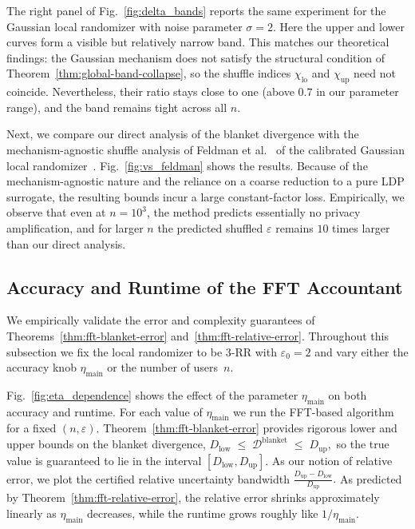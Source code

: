 \documentclass{article}
\theoremstyle{plain}
\theoremstyle{definition}
\begin{document}
The right panel of Fig.~\ref{fig:delta_bands} reports the same experiment for the Gaussian local randomizer with noise parameter $\sigma=2$.
Here the upper and lower curves form a visible but relatively narrow band.
This matches our theoretical findings: the Gaussian mechanism does not satisfy the structural condition of
Theorem~\ref{thm:global-band-collapse}, so the shuffle indices $\chi_{\mathrm{lo}}$ and $\chi_{\mathrm{up}}$ need not coincide.
Nevertheless, their ratio stays close to one (above $0.7$ in our parameter range), and the band remains tight across all $n$.


Next, we compare our direct analysis of the blanket divergence with the mechanism-agnostic shuffle analysis of Feldman et al.~\cite{feldmanHidingClonesSimple2022} of the calibrated Gaussian local randomizer~\cite{balleImprovingGaussianMechanism2018}.
Fig.~\ref{fig:vs_feldman} shows the results.
Because of the mechanism-agnostic nature and the reliance on a coarse reduction to a pure LDP surrogate, the resulting bounds incur a large constant-factor loss.
Empirically, we observe that even at $n=10^3$, the method predicts essentially no privacy amplification, and for larger $n$ the predicted shuffled $\varepsilon$ remains $10$ times larger than our direct analysis.


\subsection{Accuracy and Runtime of the FFT Accountant}
\label{subsec:exp-fft}

We empirically validate the error and complexity guarantees of
Theorems~\ref{thm:fft-blanket-error} and~\ref{thm:fft-relative-error}.
Throughout this subsection we fix the local randomizer to be $3$-RR with $\varepsilon_0=2$ and vary either the
accuracy knob $\eta_{\mathrm{main}}$ or the number of users~$n$.


Fig.~\ref{fig:eta_dependence} shows the effect of the parameter
$\eta_{\mathrm{main}}$ on both accuracy and runtime.
For each value of $\eta_{\mathrm{main}}$ we run the FFT-based algorithm for a
fixed $(n,\varepsilon)$.
Theorem~\ref{thm:fft-blanket-error} provides rigorous lower and upper bounds
on the blanket divergence,
$
  D_{\mathrm{low}} \;\le\;
  \mathcal{D}^{\mathrm{blanket}}
  \;\le\; D_{\mathrm{up}},
$
so the true value is guaranteed to lie in the interval
$[D_{\mathrm{low}},D_{\mathrm{up}}]$.
As our notion of relative error, we plot the certified relative uncertainty bandwidth
$
  \frac{D_{\mathrm{up}} - D_{\mathrm{low}}}{D_{\mathrm{up}}}.
$
As predicted by Theorem~\ref{thm:fft-relative-error}, the relative error shrinks approximately linearly as $\eta_{\mathrm{main}}$ decreases, while the
runtime grows roughly like $1/\eta_{\mathrm{main}}$.
\end{document}
